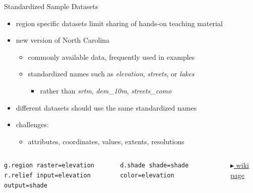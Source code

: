\documentclass[xcolor={dvipsnames,usenames},beamer]{beamer}
\begin{document}
\begin{frame}[fragile]{Standardized Sample Datasets}

\begin{itemize}
 \item region specific datasets limit sharing of hands-on teaching material
 \item new version of North Carolina
 \begin{itemize}
  \item commonly available data, frequently used in examples
  \item standardized names such as \textit{elevation}, \textit{streets}, or \textit{lakes}
  \begin{itemize}
   \item rather than \textit{srtm}, \textit{dem\_10m}, \textit{streets\_como}
  \end{itemize}
 \end{itemize}
 \item \alert{different datasets should use the same standardized names}
 \item challenges:
 \begin{itemize}
  \item attributes, coordinates, values, extents, resolutions
 \end{itemize}

\end{itemize}

\smallskip

\begin{columns}[c]

\scriptsize
\begin{verbatim}
g.region raster=elevation
r.relief input=elevation output=shade
\end{verbatim}
\begin{verbatim}
d.shade shade=shade color=elevation
\end{verbatim}
\vfill\hfill\hfill
\href{http://grasswiki.osgeo.org/wiki/GRASS_GIS_Standardized_Sample_Datasets}{%
$\blacktriangleright$ wiki page}


\end{columns}
\end{frame}
\end{document}
